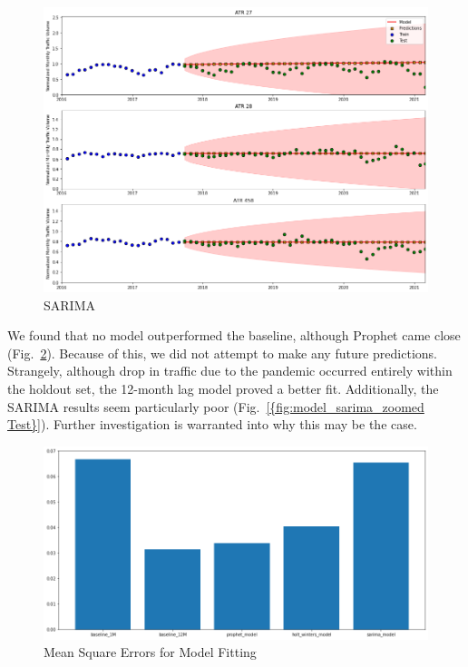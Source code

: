 \documentclass[9pt,twocolumn,twoside, lineno]{jost-new}
\numberwithin{subsection}{section}
\begin{document}
\begin{figure}
\centering
    \includegraphics[width=14.4cm]{figures/model_sarima_zoomed.png}
\caption{SARIMA}
\label{fig:model_sarima_zoomed Test}
\end{figure}

We found that no model outperformed the baseline, although Prophet came close (Fig.~\ref{fig:model_mean_squared_error}).
Because of this, we did not attempt to make any future predictions.
Strangely, although drop in traffic due to the pandemic occurred entirely within the holdout set, the 12-month lag model proved a better fit.
Additionally, the SARIMA results seem particularly poor (Fig.~\ref{{fig:model_sarima_zoomed Test}}).
Further investigation is warranted into why this may be the case.

\begin{figure}
\centering
    \includegraphics[width=14.4cm]{figures/model_mean_squared_error.png}
\caption{Mean Square Errors for Model Fitting}
\label{fig:model_mean_squared_error}
\end{figure}
\end{document}
